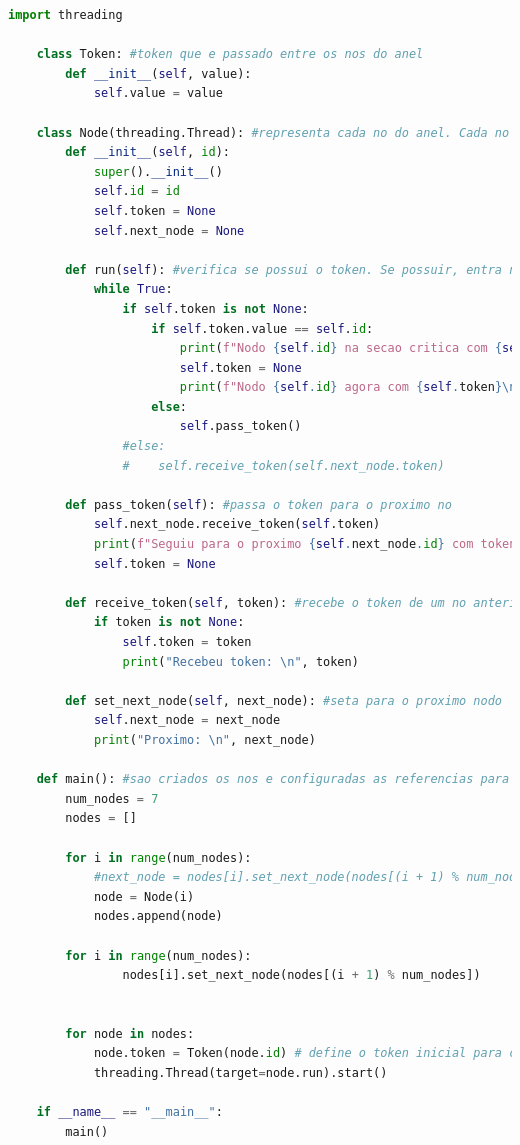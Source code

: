 \documentclass[10pt,conference]{IEEEtran}
\begin{document}
\begin{lstlisting}[language=Python, caption=Código de implementação do Algoritmo de Exclusão Mútua Distribuído Baseado em Anel]
    import threading
    
    class Token: #token que e passado entre os nos do anel
        def __init__(self, value):
            self.value = value
    
    class Node(threading.Thread): #representa cada no do anel. Cada no e executado em uma thread separada e possui um identificador, um token e uma referencia para o proximo no no anel
        def __init__(self, id):
            super().__init__()
            self.id = id
            self.token = None
            self.next_node = None
    
        def run(self): #verifica se possui o token. Se possuir, entra na secao critica e imprime uma mensagem. Caso contrario, passa o token para o proximo no
            while True:
                if self.token is not None:
                    if self.token.value == self.id:
                        print(f"Nodo {self.id} na secao critica com {self.token}\n")
                        self.token = None
                        print(f"Nodo {self.id} agora com {self.token}\n")
                    else:
                        self.pass_token()
                #else:
                #    self.receive_token(self.next_node.token)
    
        def pass_token(self): #passa o token para o proximo no
            self.next_node.receive_token(self.token)
            print(f"Seguiu para o proximo {self.next_node.id} com token: \n", self.token)
            self.token = None
    
        def receive_token(self, token): #recebe o token de um no anterior
            if token is not None:
                self.token = token
                print("Recebeu token: \n", token)
    
        def set_next_node(self, next_node): #seta para o proximo nodo
            self.next_node = next_node
            print("Proximo: \n", next_node)
    
    def main(): #sao criados os nos e configuradas as referencias para o proximo no. Em seguida, cada no e iniciado em uma thread separada
        num_nodes = 7
        nodes = []
    
        for i in range(num_nodes):
            #next_node = nodes[i].set_next_node(nodes[(i + 1) % num_nodes])
            node = Node(i)
            nodes.append(node)
    
        for i in range(num_nodes):
                nodes[i].set_next_node(nodes[(i + 1) % num_nodes])
    
    
        for node in nodes:
            node.token = Token(node.id) # define o token inicial para cada no
            threading.Thread(target=node.run).start()
    
    if __name__ == "__main__":
        main()
\end{lstlisting}
\end{document}
